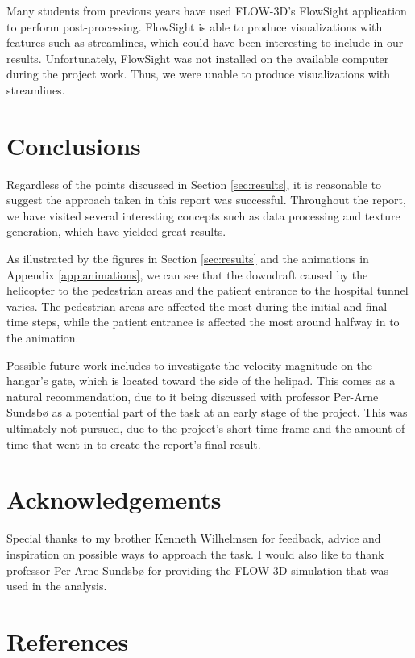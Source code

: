\documentclass[a4paper,11pt]{extarticle}
\begin{document}
Many students from previous years have used FLOW-3D's FlowSight \citep{flowsight} application to perform post-processing. FlowSight is able to produce visualizations with features such as streamlines, which could have been interesting to include in our results. Unfortunately, FlowSight was not installed on the available computer during the project work. Thus, we were unable to produce visualizations with streamlines.

\section{Conclusions}
Regardless of the points discussed in Section \ref{sec:results}, it is reasonable to suggest the approach taken in this report was successful. Throughout the report, we have visited several interesting concepts such as data processing and texture generation, which have yielded great results.

As illustrated by the figures in Section \ref{sec:results} and the animations in Appendix \ref{app:animations}, we can see that the downdraft caused by the helicopter to the pedestrian areas and the patient entrance to the hospital tunnel varies. The pedestrian areas are affected the most during the initial and final time steps, while the patient entrance is affected the most around halfway in to the animation.

Possible future work includes to investigate the velocity magnitude on the hangar's gate, which is located toward the side of the helipad. This comes as a natural recommendation, due to it being discussed with professor Per-Arne Sundsbø as a potential part of the task at an early stage of the project. This was ultimately not pursued, due to the project's short time frame and the amount of time that went in to create the report's final result.

\section{Acknowledgements}
Special thanks to my brother Kenneth Wilhelmsen for feedback, advice and inspiration on possible ways to approach the task. I would also like to thank professor Per-Arne Sundsbø for providing the FLOW-3D simulation that was used in the analysis.

\section{References}
\begingroup
\def\section*#1{}


\endgroup
\end{document}
